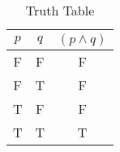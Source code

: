 \begin{table}[ht]
\caption{Truth Table}
\centering
\begin{tabular}{|c|c||c|}
\hline
$ p $ & $ q $ & $ (p \wedge q) $ \\
\hline
F & F & F \\
F & T & F \\
T & F & F \\
T & T & T \\
\hline
\end{tabular}
\label{table:tt1}
\end{table}
